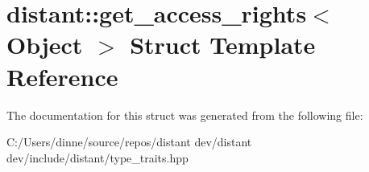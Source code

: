 \hypertarget{structdistant_1_1get__access__rights}{}\section{distant\+:\+:get\+\_\+access\+\_\+rights$<$ Object $>$ Struct Template Reference}
\label{structdistant_1_1get__access__rights}


The documentation for this struct was generated from the following file\+:\begin{DoxyCompactItemize}
\item 
C\+:/\+Users/dinne/source/repos/distant dev/distant dev/include/distant/type\+\_\+traits.\+hpp\end{DoxyCompactItemize}
